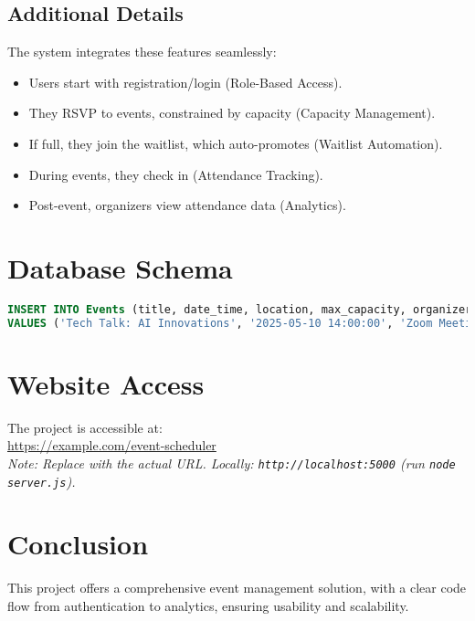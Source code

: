 \documentclass[12pt]{article}
\begin{document}
\subsection{Additional Details}
The system integrates these features seamlessly:
\begin{itemize}
    \item Users start with registration/login (Role-Based Access).
    \item They RSVP to events, constrained by capacity (Capacity Management).
    \item If full, they join the waitlist, which auto-promotes (Waitlist Automation).
    \item During events, they check in (Attendance Tracking).
    \item Post-event, organizers view attendance data (Analytics).
\end{itemize}

\section{Database Schema}
\begin{lstlisting}[language=SQL, caption={Sample Event}]
INSERT INTO Events (title, date_time, location, max_capacity, organizer_id, check_in_code) 
VALUES ('Tech Talk: AI Innovations', '2025-05-10 14:00:00', 'Zoom Meeting', 50, 1, 'AI2025TT');
\end{lstlisting}

\section{Website Access}
The project is accessible at: \\
\url{https://example.com/event-scheduler} \\
\textit{Note: Replace with the actual URL. Locally: \texttt{http://localhost:5000} (run \texttt{node server.js}).}

\section{Conclusion}
This project offers a comprehensive event management solution, with a clear code flow from authentication to analytics, ensuring usability and scalability.
\end{document}
